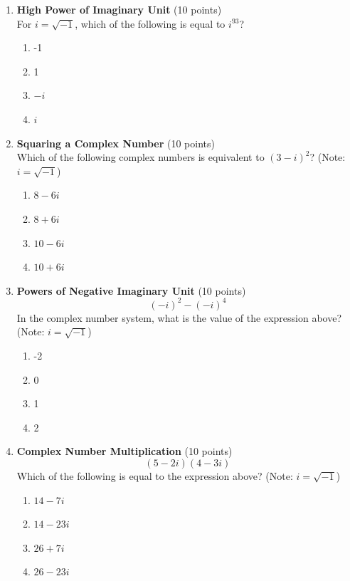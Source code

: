 \begin{enumerate}
  \item \textbf{High Power of Imaginary Unit} (10 points)\\
  For $i=\sqrt{-1}$, which of the following is equal to $i^{93}$?
  \begin{enumerate}[label=(\Alph*)]
    \item -1
    \item 1
    \item $-i$
    \item $i$
  \end{enumerate}
  \begin{subanswer}
  \end{subanswer}

  \item \textbf{Squaring a Complex Number} (10 points)\\
  Which of the following complex numbers is equivalent to $(3-i)^2$? (Note: $i=\sqrt{-1}$)
  \begin{enumerate}[label=(\Alph*)]
    \item $8-6 i$
    \item $8+6 i$
    \item $10-6 i$
    \item $10+6 i$
  \end{enumerate}
  \begin{subanswer}
  \end{subanswer}

  \item \textbf{Powers of Negative Imaginary Unit} (10 points)\\
  \[
  (-i)^2-(-i)^4
  \]
  In the complex number system, what is the value of the expression above? (Note: $i=\sqrt{-1}$)
  \begin{enumerate}[label=(\Alph*)]
    \item -2
    \item 0
    \item 1
    \item 2
  \end{enumerate}
  \begin{subanswer}
  \end{subanswer}

  \item \textbf{Complex Number Multiplication} (10 points)\\
  \[
  (5-2 i)(4-3 i)
  \]
  Which of the following is equal to the expression above? (Note: $i=\sqrt{-1}$)
  \begin{enumerate}[label=(\Alph*)]
    \item $14-7 i$
    \item $14-23 i$
    \item $26+7 i$
    \item $26-23 i$
  \end{enumerate}
  \begin{subanswer}
  \end{subanswer}


\end{enumerate}
